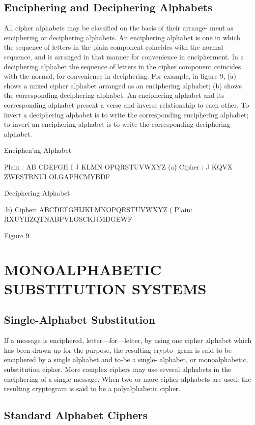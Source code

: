 \subsection{Enciphering and Deciphering Alphabets}

All cipher alphabets may be classiﬁed on the basis of their arrange-
ment as enciphering or deciphering alphabets. An enciphering alphabet is
one in which the sequence of letters in the plain component coincides with
the normal sequence, and is arranged in that manner for convenience
in encipherment. In a deciphering alphabet the sequence of letters in the
cipher component coincides with the normal, for convenience in deciphering. For example, in ﬁgure 9, (a) shows a mixed cipher alphabet
arranged as an enciphering alphabet; (b) shows the corresponding
deciphering alphabet. An enciphering alphabet and its corresponding
alphabet present a verse and inverse relationship to each other. To invert
a deciphering alphabet is to write the corresponding enciphering alphabet;
to invert an enciphering alphabet is to write the corresponding deciphering alphabet.

Enciphen'ng Alphabet

Plain : AB CDEFGH I J KLMN OPQRSTUVWXYZ
(a) Cipher : J KQVX ZWESTRNUI OLGAPHCMYBDF

Deciphering Alphabet

.b) Cipher: ABCDEFGHIJKLMNOPQRSTUVWXYZ
( Plain: RXUYHZQTNABPVLOSCKIJMDGEWF

Figure 9.

\section{MONOALPHABETIC SUBSTITUTION SYSTEMS}

\subsection{Single-Alphabet Substitution}

If a message is enciphered, letter—for—letter, by using one cipher
alphabet which has been drawn up for the purpose, the resulting crypto-
gram is said to be enciphered by a single alphabet and to-be a single-
alphabet, or monoalphabetic, substitution cipher. More complex ciphers
may use several alphabets in the enciphering of a single message. When
two or more cipher alphabets are used, the resulting cryptogram is said
to be a polyalphabetic cipher.

\subsection{Standard Alphabet Ciphers}

